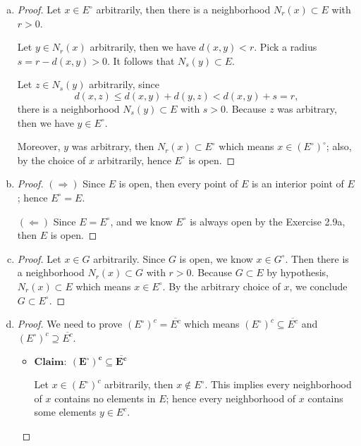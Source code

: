 \begin{Exercise}
\begin{enumerate}[a)]
\item
\begin{proof}
Let $x\in E^{\circ}$ arbitrarily, then there is a neighborhood $N_r(x)\subset E$ with $r>0$.

Let $y\in N_r(x)$ arbitrarily, then we have $d(x,y)<r$. Pick a radius $s=r-d(x,y)>0$. It follows that $N_s(y)\subset E$. 

Let $z\in N_s(y)$ arbitrarily, since
$$
d(x,z) \leq d(x,y)+d(y,z) < d(x,y) + s = r,
$$
there is a neighborhood $N_s(y)\subset E$ with $s>0$. Because $z$ was arbitrary, then we have $y\in E^{\circ}$.

Moreover, $y$ was arbitrary, then $N_r(x)\subset E^{\circ}$ which means $x\in (E^{\circ})^{\circ}$; also, by the choice of $x$ arbitrarily, hence $E^{\circ}$ is open.
\end{proof}

\item
\begin{proof}
$(\Longrightarrow)$
Since $E$ is open, then every point of $E$ is an interior point of $E$; hence $E^{\circ} = E$.

$(\Longleftarrow)$
Since $E = E^{\circ}$, and we know $E^{\circ}$ is always open by the Exercise 2.9a, then $E$ is open.
\end{proof}

\item
\begin{proof}
Let $x\in G$ arbitrarily. Since $G$ is open, we know $x\in G^{\circ}$. Then there is a neighborhood $N_r(x)\subset G$ with $r>0$. Because $G\subset E$ by hypothesis, $N_r(x)\subset E$ which means $x\in E^{\circ}$. By the arbitrary choice of $x$, we conclude $G\subset E^{\circ}$.
\end{proof}

\item
\begin{proof}
We need to prove $(E^{\circ})^c = \overline{E^c}$ which means $(E^{\circ})^c \subseteq \overline{E^c}$ and $(E^{\circ})^c \supseteq \overline{E^c}$.

\begin{itemize}
\item $\mathbf{Claim:\ (E^{\circ})^c \subseteq \overline{E^c}}$

Let $x\in(E^{\circ})^c$ arbitrarily, then $x\notin E^{\circ}$. This implies every neighborhood of $x$ contains no elements in $E$; hence every neighborhood of $x$ contains some elements $y\in E^c$.


\end{itemize}
\end{proof}
\end{enumerate}
\end{Exercise}
